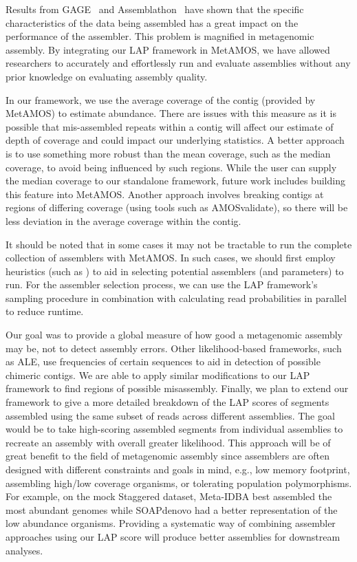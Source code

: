 
Results from GAGE~\cite{salzberg2011gage} and Assemblathon~\cite{earl2011assemblathon,bradnam2013assemblathon} have shown that the specific characteristics of the data being assembled has a great impact on the performance of the assembler.
This problem is magnified in metagenomic assembly.
By integrating our LAP framework in MetAMOS, we have allowed researchers to accurately and effortlessly run and evaluate assemblies without any prior knowledge on evaluating assembly quality.

In our framework, we use the average coverage of the contig (provided by MetAMOS) to estimate abundance.
There are issues with this measure as it is possible that mis-assembled repeats within a contig will affect our estimate of depth of coverage and could impact our underlying statistics.
A better approach is to use something more robust than the mean coverage, such as the median coverage, to avoid being influenced by such regions.
While the user can supply the median coverage to our standalone framework, future work includes building this feature into MetAMOS.
Another approach involves breaking contigs at regions of differing coverage (using tools such as AMOSvalidate\cite{phillippy2008genome}), so there will be less deviation in the average coverage within the contig.

It should be noted that in some cases it may not be tractable to run the complete collection of assemblers with MetAMOS.
In such cases, we should first employ heuristics (such as \cite{chikhi2013informed}) to aid in selecting potential assemblers (and parameters) to run.
For the assembler selection process, we can use the LAP framework's sampling procedure in combination with calculating read probabilities in parallel to reduce runtime.

Our goal was to provide a global measure of how good a metagenomic assembly may be, not to detect assembly errors.
Other likelihood-based frameworks, such as ALE, use frequencies of certain sequences to aid in detection of possible chimeric contigs.
We are able to apply similar modifications to our LAP framework to find regions of possible misassembly.
Finally, we plan to extend our framework to give a more detailed breakdown of the LAP scores of segments assembled using the same subset of reads across different assemblies.
The goal would be to take high-scoring assembled segments from individual assemblies to recreate an assembly with overall greater likelihood.
This approach will be of great benefit to the field of metagenomic assembly since assemblers are often designed with different constraints and goals in mind, e.g., low memory footprint, assembling high/low coverage organisms, or tolerating population polymorphisms.
For example, on the mock Staggered dataset, Meta-IDBA best assembled the most abundant genomes while SOAPdenovo had a better representation of the low abundance organisms.
Providing a systematic way of combining assembler approaches using our LAP score will produce better assemblies for downstream analyses.


